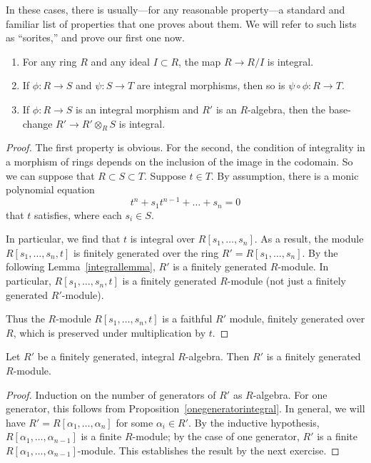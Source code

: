 In these cases, there is usually---for any reasonable property---a standard
and familiar list of
properties that one proves about them. We will refer to such lists as
``sorites,'' and prove our first one now.

\begin{proposition}
\begin{enumerate}
\item For any ring $R$ and any ideal $I \subset R$, the map $R \to R/I$ is
integral. 
\item If $\phi: R \to S$ and $\psi: S \to T$ are integral morphisms, then so
is $\psi \circ \phi: R \to T$.
\item If $\phi: R \to S$ is an integral morphism and $R'$ is an $R$-algebra,
then the base-change
$R' \to R' \otimes_R S$ is integral.
\end{enumerate}
\end{proposition} 

\begin{proof} 
The first property is obvious. For the second, the condition of
integrality in a morphism of rings depends on the inclusion of the image
in the codomain. So we can suppose that $R \subset S \subset T$. Suppose $t
\in T$. By assumption, there is a monic polynomial equation
\[ t^n + s_1 t^{n-1} + \dots + s_n = 0  \]
that $t$ satisfies, where each $s_i \in S$. 

In particular, we find that $t$ is integral over $R[s_1, \dots, s_n]$.
As a result, the module $R[s_1, \dots, s_n, t]$ is finitely generated over the
ring $R'=R[s_1, \dots, s_n]$. 
By the following Lemma~\ref{integrallemma}, $R'$ is a finitely generated $R$-module. In
particular, $R[s_1, \dots, s_n,t]$ is a finitely generated $R$-module (not just a
finitely generated $R'$-module).

Thus the $R$-module $R[s_1, \dots, s_n,t]$  is a faithful 
$R'$ module, finitely generated over $R$, which is preserved under
multiplication by $t$.
\end{proof} 

\begin{lemma} 
Let $R'$ be a finitely generated, integral $R$-algebra. Then $R'$ is a
finitely generated $R$-module.
\end{lemma} 
\begin{proof} 
Induction on the number of generators of $R'$ as $R$-algebra. For one
generator, this follows from Proposition~\ref{onegeneratorintegral}.
In general, we will have $R' = R[\alpha_1 ,\dots, \alpha_n]$ for some
$\alpha_i \in R'$.
By the inductive hypothesis, $R[\alpha_1 , \dots, \alpha_{n-1}]$ is a finite
$R$-module; by the case of one generator, $R'$ is a finite $R[\alpha_1, \dots,
\alpha_{n-1}]$-module. This establishes the result by the next exercise.
\end{proof} 

